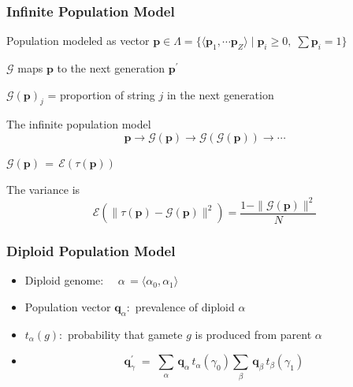 \documentclass[aspectratio=169]{beamer}
\begin{document}
  \begin{frame}
    \frametitle{Infinite Population Model}
    \begin{itemize}
      \item{Population modeled as vector $\bm{p} \in \Lambda = \{\langle \bm{p}_1, \cdots \bm{p}_Z \rangle \;|\; \bm{p}_i \geq 0,\; \sum \bm{p}_i = 1 \}$}
      \item{$\mathcal{G}$ maps $\bm{p}$ to the next generation $\bm{p}^\prime$}
      \item{$\mathcal{G}(\bm{p})_j$ =  proportion of string $j$ in the next generation}
      {
      \item{The infinite population model 
	\[\bm{p} \to \mathcal{G}(\bm{p}) \to  {\mathcal{G}}(\mathcal{G}(\bm{p})) \to \cdots \]}	
      \item{$\mathcal{G}(\bm{p}) \,=\, \mathcal{E}( \tau (\bm{p}))$}
      }
      \item{The variance is
	\[\mathcal{E}(\| \tau (\bm{p}) - \mathcal{G}(\bm{p}) \|^2) = \frac{1 - \|\mathcal{G}(\bm{p})\|^2}{N}\]
      }
    \end{itemize}  
  \end{frame}   
  
  \begin{frame}
    \frametitle{ Diploid Population Model}
    \begin{itemize}
      \item{Diploid genome: $\quad \alpha \,= \langle \alpha_0, \alpha_1 \rangle$}
      \item{Population vector $\bm{q}_\alpha :$ prevalence of diploid $\alpha$}
      \item{$t_\alpha(g) :$ probability that gamete $g$ is produced from parent $\alpha$ }
      \item{\[\bm{q}_\gamma^{\prime} \; = \;
      \sum_{\alpha} \, \bm{q}_\alpha \, t_\alpha(\gamma_0) 
      \sum_{\beta} \,\bm{q}_\beta \, t_\beta(\gamma_1)\]}
    \end{itemize}
  \end{frame}
  
\end{document}
